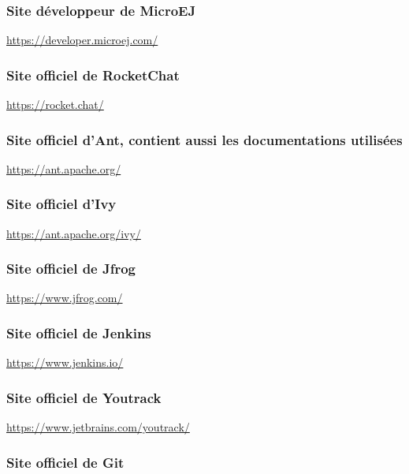 \documentclass[french,a4paper,12pt]{report}
\begin{document}
\subsubsection{Site développeur de MicroEJ}

\href{https://developer.microej.com/}{https://developer.microej.com/} 

\subsubsection{Site officiel de RocketChat}

\href{https://rocket.chat/}{https://rocket.chat/}

\subsubsection{Site officiel d'Ant, contient aussi les documentations utilisées}

\href{https://ant.apache.org/}{https://ant.apache.org/}

\subsubsection{Site officiel d'Ivy}

\href{https://ant.apache.org/ivy/}{https://ant.apache.org/ivy/}

\subsubsection{Site officiel de Jfrog}

\href{https://www.jfrog.com/}{https://www.jfrog.com/}

\subsubsection{Site officiel de Jenkins}

\href{https://www.jenkins.io/}{https://www.jenkins.io/}

\subsubsection{Site officiel de Youtrack}

\href{https://www.jetbrains.com/youtrack/}{https://www.jetbrains.com/youtrack/}

\subsubsection{Site officiel de Git}
\end{document}
